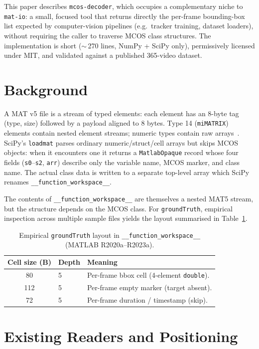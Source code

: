 \documentclass{article}
\begin{document}
This paper describes \texttt{mcos-decoder}, which occupies a
complementary niche to \texttt{mat-io}: a small, focused tool that
returns directly the per-frame bounding-box list expected by
computer-vision pipelines (e.g.\ tracker training, dataset loaders),
without requiring the caller to traverse MCOS class structures. The
implementation is short ($\sim$\,270 lines, NumPy + SciPy only),
permissively licensed under MIT, and validated against a published
365-video dataset.

\section{Background}

A MAT v5 file is a stream of typed elements: each element has an 8-byte
tag (type, size) followed by a payload aligned to 8 bytes. Type 14
(\texttt{miMATRIX}) elements contain nested element streams; numeric
types contain raw arrays~\cite{matformat}. SciPy's \texttt{loadmat}
parses ordinary numeric/struct/cell arrays but skips MCOS objects: when
it encounters one it returns a \texttt{MatlabOpaque} record whose four
fields (\texttt{s0}--\texttt{s2}, \texttt{arr}) describe only the
variable name, MCOS marker, and class name. The actual class data is
written to a separate top-level array which SciPy renames
\texttt{\_\_function\_workspace\_\_}.

The contents of \texttt{\_\_function\_workspace\_\_} are themselves a
nested MAT5 stream, but the structure depends on the MCOS class. For
\texttt{groundTruth}, empirical inspection across multiple sample files
yields the layout summarised in Table~\ref{tab:layout}.

\begin{table}[ht]
\centering
\caption{Empirical \texttt{groundTruth} layout in
\texttt{\_\_function\_workspace\_\_} (MATLAB R2020a--R2023a).}
\label{tab:layout}
\begin{tabular}{cll}
\toprule
Cell size (B) & Depth & Meaning \\
\midrule
80   & 5 & Per-frame bbox cell (4-element \texttt{double}). \\
112  & 5 & Per-frame empty marker (target absent). \\
72   & 5 & Per-frame duration / timestamp (skip). \\
\bottomrule
\end{tabular}
\end{table}

\section{Existing Readers and Positioning}
\end{document}
